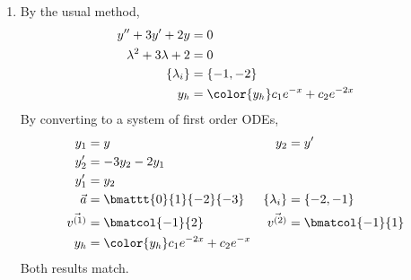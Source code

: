 \begin{enumerate}
    \item By the usual method,
          \begin{align}
              y'' + 3y' + 2y             & = 0                                    \\
              \lambda^{2} + 3\lambda + 2 & = 0                                    \\
              \{\lambda_i\}              & = \{-1, -2\}                           \\
              y_h                        & = \color{y_h} c_1 e^{-x} + c_2 e^{-2x}
          \end{align}
          By converting to a system of first order ODEs,
          \begin{align}
              y_1           & = y                                    &
              y_2           & = y'                                     \\
              y_2'          & = -3y_2 - 2y_1                           \\
              y_1'          & = y_2                                    \\
              \vec{a}       & = \bmattt{0}{1}{-2}{-3}                &
              \{\lambda_i\} & = \{-2, -1\}                             \\
              \vec{v^{(1)}} & = \bmatcol{-1}{2}                      &
              \vec{v^{(2)}} & = \bmatcol{-1}{1}                        \\
              y_h           & = \color{y_h} c_1 e^{-2x} + c_2 e^{-x}
          \end{align}
          Both results match.


\end{enumerate}

